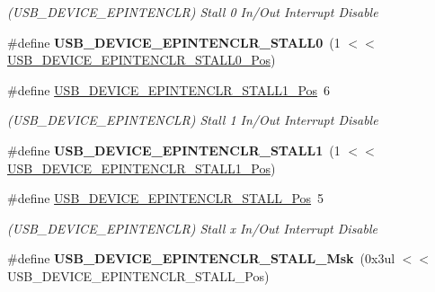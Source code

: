 \begin{DoxyCompactItemize}
\begin{DoxyCompactList}\small\item\em (U\+S\+B\+\_\+\+D\+E\+V\+I\+C\+E\+\_\+\+E\+P\+I\+N\+T\+E\+N\+C\+L\+R) Stall 0 In/\+Out Interrupt Disable \end{DoxyCompactList}\item 
\hypertarget{group___s_a_m_l21___u_s_b_ga4b52eb747f38e2963c64e8f743500221}{}\#define {\bfseries U\+S\+B\+\_\+\+D\+E\+V\+I\+C\+E\+\_\+\+E\+P\+I\+N\+T\+E\+N\+C\+L\+R\+\_\+\+S\+T\+A\+L\+L0}~(1 $<$$<$ \hyperlink{group___s_a_m_l21___u_s_b_ga6903cb46049f609160a165ef1c9565e3}{U\+S\+B\+\_\+\+D\+E\+V\+I\+C\+E\+\_\+\+E\+P\+I\+N\+T\+E\+N\+C\+L\+R\+\_\+\+S\+T\+A\+L\+L0\+\_\+\+Pos})\label{group___s_a_m_l21___u_s_b_ga4b52eb747f38e2963c64e8f743500221}

\item 
\hypertarget{group___s_a_m_l21___u_s_b_ga82aba719b6fa76577b3a6a6c3a46d4d7}{}\#define \hyperlink{group___s_a_m_l21___u_s_b_ga82aba719b6fa76577b3a6a6c3a46d4d7}{U\+S\+B\+\_\+\+D\+E\+V\+I\+C\+E\+\_\+\+E\+P\+I\+N\+T\+E\+N\+C\+L\+R\+\_\+\+S\+T\+A\+L\+L1\+\_\+\+Pos}~6\label{group___s_a_m_l21___u_s_b_ga82aba719b6fa76577b3a6a6c3a46d4d7}

\begin{DoxyCompactList}\small\item\em (U\+S\+B\+\_\+\+D\+E\+V\+I\+C\+E\+\_\+\+E\+P\+I\+N\+T\+E\+N\+C\+L\+R) Stall 1 In/\+Out Interrupt Disable \end{DoxyCompactList}\item 
\hypertarget{group___s_a_m_l21___u_s_b_ga4e4810ddb08cc75fab523c089c8c4ad8}{}\#define {\bfseries U\+S\+B\+\_\+\+D\+E\+V\+I\+C\+E\+\_\+\+E\+P\+I\+N\+T\+E\+N\+C\+L\+R\+\_\+\+S\+T\+A\+L\+L1}~(1 $<$$<$ \hyperlink{group___s_a_m_l21___u_s_b_ga82aba719b6fa76577b3a6a6c3a46d4d7}{U\+S\+B\+\_\+\+D\+E\+V\+I\+C\+E\+\_\+\+E\+P\+I\+N\+T\+E\+N\+C\+L\+R\+\_\+\+S\+T\+A\+L\+L1\+\_\+\+Pos})\label{group___s_a_m_l21___u_s_b_ga4e4810ddb08cc75fab523c089c8c4ad8}

\item 
\hypertarget{group___s_a_m_l21___u_s_b_ga35b6164a256415dc81652aa38f381584}{}\#define \hyperlink{group___s_a_m_l21___u_s_b_ga35b6164a256415dc81652aa38f381584}{U\+S\+B\+\_\+\+D\+E\+V\+I\+C\+E\+\_\+\+E\+P\+I\+N\+T\+E\+N\+C\+L\+R\+\_\+\+S\+T\+A\+L\+L\+\_\+\+Pos}~5\label{group___s_a_m_l21___u_s_b_ga35b6164a256415dc81652aa38f381584}

\begin{DoxyCompactList}\small\item\em (U\+S\+B\+\_\+\+D\+E\+V\+I\+C\+E\+\_\+\+E\+P\+I\+N\+T\+E\+N\+C\+L\+R) Stall x In/\+Out Interrupt Disable \end{DoxyCompactList}\item 
\hypertarget{group___s_a_m_l21___u_s_b_ga12611d5c3f417b9b83f0e13bc1d3e43a}{}\#define {\bfseries U\+S\+B\+\_\+\+D\+E\+V\+I\+C\+E\+\_\+\+E\+P\+I\+N\+T\+E\+N\+C\+L\+R\+\_\+\+S\+T\+A\+L\+L\+\_\+\+Msk}~(0x3ul $<$$<$ U\+S\+B\+\_\+\+D\+E\+V\+I\+C\+E\+\_\+\+E\+P\+I\+N\+T\+E\+N\+C\+L\+R\+\_\+\+S\+T\+A\+L\+L\+\_\+\+Pos)\label{group___s_a_m_l21___u_s_b_ga12611d5c3f417b9b83f0e13bc1d3e43a}


\end{DoxyCompactItemize}
